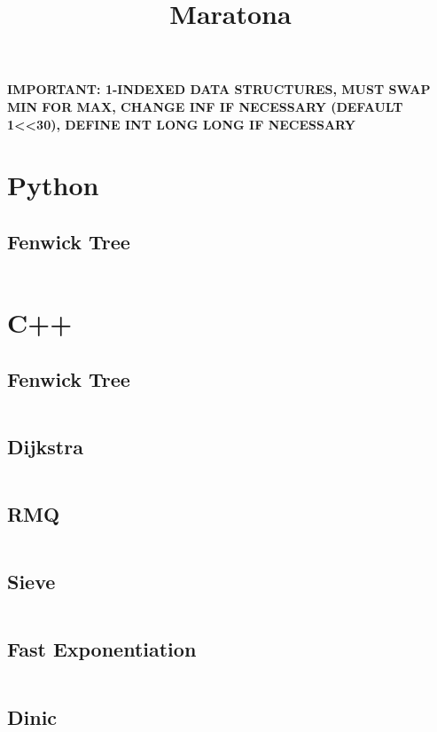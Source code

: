 \documentclass{article}
\title{Maratona}
\author{}
\date{}
\begin{document}
\maketitle

\textbf{IMPORTANT: 1-INDEXED DATA STRUCTURES, MUST SWAP MIN FOR MAX, CHANGE INF IF NECESSARY (DEFAULT 1<<30), DEFINE INT LONG LONG IF NECESSARY}

\tableofcontents
\newpage

\section{Python}
\subsection{Fenwick Tree}
\inputminted{python}{code/fenwick.py}

\section{C++}
\subsection{Fenwick Tree}
\inputminted[obeytabs=true,tabsize=4]{cpp}{code/fenwick.cpp}
\subsection{Dijkstra}
\inputminted[obeytabs=true,tabsize=4]{cpp}{code/dijkstra.cpp}
\subsection{RMQ}
\inputminted[obeytabs=true,tabsize=4]{cpp}{code/rmq.cpp}
\subsection{Sieve}
\inputminted[obeytabs=true,tabsize=4]{cpp}{code/sieve.cpp}
\subsection{Fast Exponentiation}
\inputminted[obeytabs=true,tabsize=4]{cpp}{code/fast_exp.cpp}
\subsection{Dinic}
\inputminted[obeytabs=true,tabsize=4]{cpp}{code/dinic.cpp}
\end{document}
